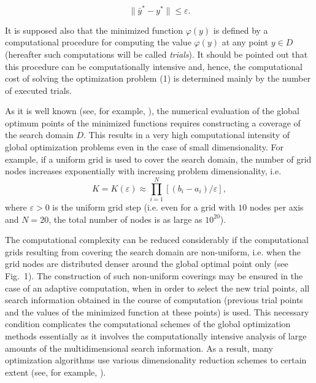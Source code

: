 \documentclass[
11pt,%
tightenlines,%
twoside,%
onecolumn,%
nofloats,%
nobibnotes,%
nofootinbib,%
superscriptaddress,%
noshowpacs,%
centertags]%
{revtex4}
\begin{document}
\[
\|\bar{y}^\ast - y^\ast\| \leq \varepsilon.
\]

It is supposed also that the minimized function $\varphi(y)$ is defined by a computational procedure for computing the value $\varphi(y)$ at any point $y \in D$ (hereafter such computations will be called \textit{trials}). It should be pointed out that this procedure can be computationally intensive and, hence, the computational cost of solving the optimization problem (1) is determined mainly by the number of executed trials. 

As it is well known (see, for example, \cite{Strongin1}), the numerical evaluation of the global optimum points of the minimized functions requires constructing a coverage of the search domain $D$. This results in a very high computational intensity of global optimization problems even in the case of small dimensionality. For example, if a uniform grid is used to cover the search domain, the number of grid nodes increases exponentially with increasing problem dimensionality, i.e. 
\[
K = K(\varepsilon) \approx \prod_{i=1}^N[(b_i - a_i) / \varepsilon],
\]
where $\varepsilon > 0$ is the uniform grid step (i.e. even for a grid with $10$ nodes per axis and $N = 20$, the total number of nodes is as large as $10^{20}$).

The computational complexity can be reduced considerably if the computational grids resulting from covering the search domain are non-uniform, i.e. when the grid nodes are distributed denser around the global optimal point only (see Fig.~1). The construction of such non-uniform coverings may be ensured in the case of an adaptive computation, when in order to select the new trial points, all search information obtained in the course of computation (previous trial points and the values of the minimized function at these points) is used. This necessary condition complicates the computational schemes of the global optimization methods essentially as it involves the computationally intensive analysis of large amounts of the multidimensional search information. As a result, many optimization algorithms use various dimensionality reduction schemes to certain extent (see, for example, \cite{Strongin1, Strongin2, Sergeyev2}).
\end{document}
